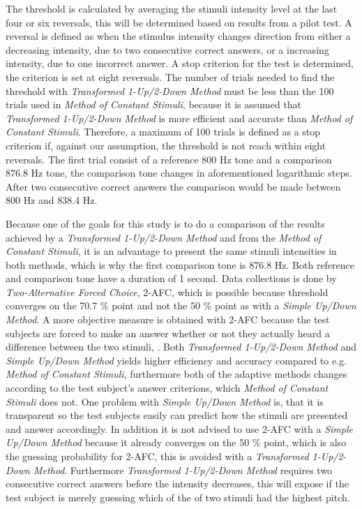 \noindent
%
The threshold is calculated by averaging the stimuli intensity level at the last four or six reversals, this will be determined based on results from a pilot test. A reversal is defined as when the stimulus intensity changes direction from either a decreasing intensity, due to two consecutive correct answers, or a increasing intensity, due to one incorrect answer. A stop criterion for the test is determined, the criterion is set at eight reversals. The number of trials needed to find the threshold with  \textit{Transformed 1-Up/2-Down Method} must be less than the 100 trials used in \textit{Method of Constant Stimuli}, because it is assumed that \textit{Transformed 1-Up/2-Down Method} is more efficient and accurate than \textit{Method of Constant Stimuli}. Therefore, a maximum of 100 trials is defined as a stop criterion if, against our assumption, the threshold is not reach within eight reversals. The first trial consist of a reference 800 Hz tone and a comparison 876.8 Hz tone, the comparison tone changes in aforementioned logarithmic steps. After two consecutive correct answers the comparison would be made between 800 Hz and 838.4 Hz.

Because one of the goals for this study is to do a comparison of the results achieved by a \textit{Transformed 1-Up/2-Down Method} and from the \textit{Method of Constant Stimuli}, it is an advantage to present the same stimuli intensities in both methods, which is why the first comparison tone is 876.8 Hz. Both reference and comparison tone have a duration of 1 second.\blankline
%               
Data collections is done by \textit{Two-Alternative Forced Choice}, 2-AFC, which is possible because threshold converges on the 70.7 \% point and not the 50 \% point as with a \textit{Simple Up/Down Method}. A more objective measure is obtained with 2-AFC because the test subjects are forced to make an answer whether or not they actually heard a difference between the two stimuli, \parencite[p. 1219]{PDF:PsyphyMethods}.\blankline 
%
Both \textit{Transformed 1-Up/2-Down Method} and \textit{Simple Up/Down Method} yields higher efficiency and accuracy compared to e.g. \textit{Method of Constant Stimuli}, furthermore both of the adaptive methods changes according to the test subject's answer criterions, which \textit{Method of Constant Stimuli} does not. One problem with \textit{Simple Up/Down Method} is, that it is transparent so the test subjects easily can predict how the stimuli are presented and answer accordingly. In addition it is not advised to use 2-AFC with a \textit{Simple Up/Down Method} because it already converges on the 50 \% point, which is also the guessing probability for 2-AFC, this is avoided with a \textit{Transformed 1-Up/2-Down Method}. Furthermore \textit{Transformed 1-Up/2-Down Method} requires two consecutive correct answers before the intensity decreases, this will expose if the test subject is merely guessing which of the of two stimuli had the highest pitch. 


